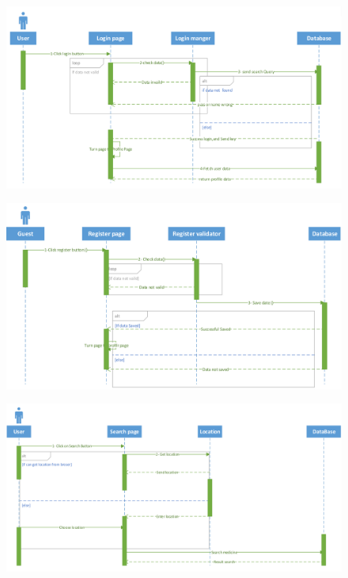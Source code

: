 \documentclass[]{article}
\begin{document}
\begin{figure}[H]
\centering
\includegraphics[scale=0.3]{./sequence/01}
\end{figure}
\begin{figure}[H]
\centering
\includegraphics[scale=0.3]{./sequence/02}
\end{figure}
\begin{figure}[H]
\centering
\includegraphics[scale=0.3]{./sequence/03}
\end{figure}
\end{document}
